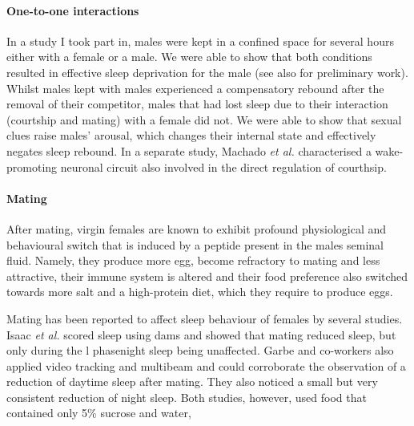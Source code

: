 \paragraph*{One-to-one interactions}

In a study I took part in, males were kept in a confined space for several hours either with a female or a male\cite{beckwith_regulation_2017}.
We were able to show that both conditions resulted in effective sleep deprivation for the male\cite{beckwith_regulation_2017} (see also \cite{gilestro_widespread_2009} for preliminary work).
Whilst males kept with males experienced a compensatory rebound after the removal of their competitor, 
males that had lost sleep due to their interaction (courtship and mating) with a female did not\cite{beckwith_regulation_2017}.
We were able to show that sexual clues raise males' arousal, which changes their internal state and effectively negates sleep rebound.
In a separate study, Machado \emph{et al.} characterised a wake-promoting neuronal circuit also involved in the direct regulation of courthsip\cite{lamaze_regulation_2017,stahl_sleep_2017}.

\paragraph*{Mating}

After mating, virgin females are known to exhibit profound physiological and behavioural switch that is induced by a peptide present in the males seminal fluid\cite{gillott_male_2003,mcgraw_genes_2004,yapici_receptor_2008}.
Namely, they produce more egg, become refractory to mating and less attractive\cite{gillott_male_2003},
their immune system is altered\cite{kapelnikov_mating_2008,innocenti_immunogenic_nodate} and 
their food preference also switched towards more salt and a high-protein diet, which they require to produce eggs\cite{ribeiro_sex_2010,walker_postmating_2015}.

Mating has been reported to affect sleep behaviour of females by several studies\cite{isaac_drosophila_2010,zimmerman_genetic_2012,garbe_context-specific_2015,garbe_changes_2016}.
Isaac \emph{et al.} scored sleep using \glspl{dam} and showed that mating reduced sleep, but only during the \gls{l} phase\emd{}night sleep being unaffected\cite{isaac_drosophila_2010}.
Garbe and co-workers also applied video tracking and multibeam and could corroborate the observation of a reduction of daytime sleep after mating\cite{garbe_context-specific_2015}. 
They also noticed a small but very consistent reduction of night sleep.
Both studies, however, used food that contained only 5\% sucrose and water,

